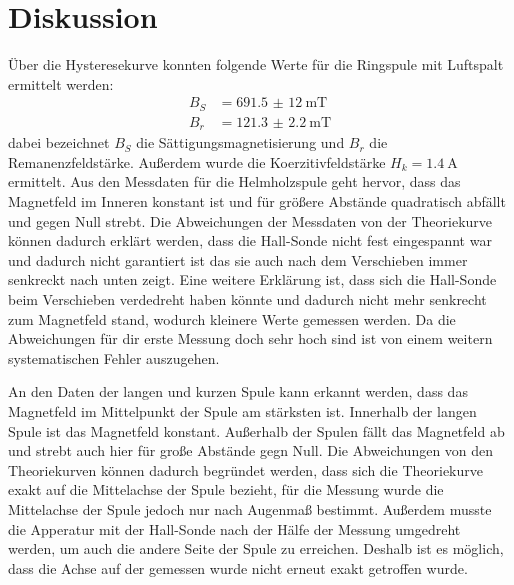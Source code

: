 \section{Diskussion}
Über die Hysteresekurve konnten folgende Werte für die
Ringspule mit Luftspalt ermittelt werden:
\begin{align*}
  B_{S} &=\SI{691,5(12)}{\milli\tesla} \\
  B_{r} &=\SI{121.3(22)}{\milli\tesla}
\end{align*}
\noindent dabei bezeichnet $B_{S}$ die Sättigungsmagnetisierung
und $B_{r}$ die Remanenzfeldstärke. Außerdem wurde die
Koerzitivfeldstärke $H_{k}=\SI{1,4}{\ampere}$
ermittelt.
\noindent Aus den Messdaten für die Helmholzspule geht hervor, dass
das Magnetfeld im Inneren konstant ist und für größere
Abstände quadratisch abfällt und gegen Null strebt.
Die Abweichungen der Messdaten von der Theoriekurve können
dadurch erklärt werden, dass die Hall-Sonde nicht
fest eingespannt war und dadurch nicht garantiert ist
das sie auch nach dem Verschieben immer senkreckt nach
unten zeigt. Eine weitere Erklärung ist, dass sich die
Hall-Sonde beim Verschieben verdedreht haben könnte
und dadurch nicht mehr senkrecht zum Magnetfeld stand, wodurch
kleinere Werte gemessen werden.
\noindent Da die Abweichungen für dir erste Messung doch sehr hoch sind
ist von einem weitern systematischen Fehler auszugehen.

\noindent An den Daten der langen und kurzen Spule  kann erkannt
werden, dass das Magnetfeld im Mittelpunkt der Spule am
stärksten ist. Innerhalb der langen Spule ist das
Magnetfeld konstant. Außerhalb der Spulen fällt das
Magnetfeld ab und strebt auch hier für große
Abstände gegn Null.
\noindent Die Abweichungen von den Theoriekurven können dadurch begründet
werden, dass sich die Theoriekurve exakt auf die
Mittelachse der Spule bezieht, für die Messung wurde
die Mittelachse der Spule jedoch nur nach Augenmaß bestimmt.
Außerdem musste die Apperatur mit der Hall-Sonde nach der
Hälfe der Messung umgedreht werden, um auch die andere
Seite der Spule zu erreichen. Deshalb ist es möglich, dass
die Achse auf der gemessen wurde nicht erneut exakt
getroffen wurde.





\label{sec:Diskussion}
